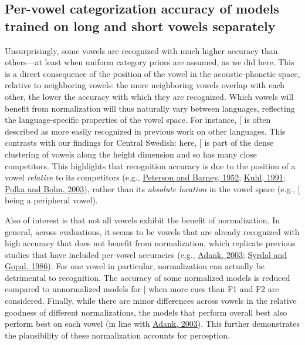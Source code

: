 \documentclass[utf8]{frontiers_suppmat} %
\begin{document}
\hypertarget{sec:accuracy-per-vowel}{%
\subsection{Per-vowel categorization accuracy of models trained on long and short vowels separately}\label{sec:accuracy-per-vowel}}

Unsurprisingly, some vowels are recognized with much higher accuracy than others---at least when uniform category priors are assumed, as we did here. This is a direct consequence of the position of the vowel in the acoustic-phonetic space, relative to neighboring vowels: the more neighboring vowels overlap with each other, the lower the accuracy with which they are recognized. Which vowels will benefit from normalization will thus naturally vary between languages, reflecting the language-specific properties of the vowel space. For instance, {[}\ipatext{iː}{]} is often described as more easily recognized in previous work on other languages. This contrasts with our findings for Central Swedish: here, {[}\ipatext{iː}{]} is part of the dense clustering of vowels along the height dimension and so has many close competitors. This highlights that recognition accuracy is due to the position of a vowel \emph{relative} to its competitors (e.g., \protect\hyperlink{ref-Peterson1952}{Peterson and Barney, 1952}; \protect\hyperlink{ref-Kuhl1991}{Kuhl, 1991}; \protect\hyperlink{ref-Polka2003}{Polka and Bohn, 2003}), rather than its \emph{absolute location} in the vowel space (e.g., {[}\ipatext{iː}{]} being a peripheral vowel).

Also of interest is that not all vowels exhibit the benefit of normalization. In general, across evaluations, it seems to be vowels that are already recognized with high accuracy that does not benefit from normalization, which replicate previous studies that have included per-vowel accuracies (e.g., \protect\hyperlink{ref-adank2003}{Adank, 2003}; \protect\hyperlink{ref-Syrdal1986}{Syrdal and Gopal, 1986}). For one vowel in particular, normalization can actually be detrimental to recognition. The accuracy of some normalized models is reduced compared to unnormalized models for {[}\ipatext{ʉː}{]} when more cues than F1 and F2 are considered. Finally, while there are minor differences across vowels in the relative goodness of different normalizations, the models that perform overall best also perform best on each vowel (in line with \protect\hyperlink{ref-adank2003}{Adank, 2003}). This further demonstrates the plausibility of these normalization accounts for perception.
\end{document}
